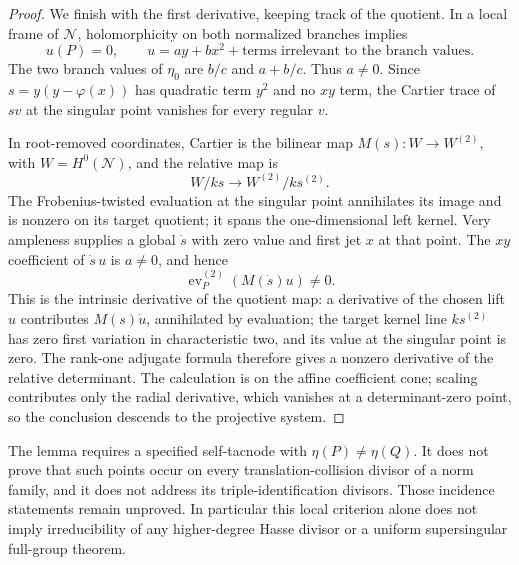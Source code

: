 \begin{proof}
We finish with the first derivative, keeping track of the quotient.
In a local frame of $\mathcal N$, holomorphicity on both normalized
branches implies
\[
        u(P)=0,\qquad
        u=a y+b x^2+\text{terms irrelevant to the branch values}.
\]
The two branch values of $\eta_0$ are $b/c$ and $a+b/c$.
Thus $a\ne0$. Since $s=y(y-\varphi(x))$ has quadratic term $y^2$
and no $xy$ term, the Cartier trace of $sv$ at the singular point
vanishes for every regular $v$.

In root-removed coordinates, Cartier is the bilinear map
$M(s):W\to W^{(2)}$, with $W=H^0(\mathcal N)$, and the relative
map is
\[
                   W/ks\longrightarrow W^{(2)}/ks^{(2)}.
\]
The Frobenius-twisted evaluation at the singular point annihilates
its image and is nonzero on its target quotient; it spans the
one-dimensional left kernel. Very ampleness supplies a global
$\dot s$ with zero value and first jet $x$ at that point. The
$xy$ coefficient of $\dot s\,u$ is $a\ne0$, and hence
\[
             \operatorname{ev}^{(2)}_P(M(\dot s)u)\ne0.
\]
This is the intrinsic derivative of the quotient map: a derivative
of the chosen lift $u$ contributes $M(s)\dot u$, annihilated by
evaluation; the target kernel line $ks^{(2)}$ has zero first
variation in characteristic two, and its value at the singular
point is zero. The rank-one adjugate formula therefore gives a
nonzero derivative of the relative determinant. The calculation
is on the affine coefficient cone; scaling contributes only the
radial derivative, which vanishes at a determinant-zero point, so
the conclusion descends to the projective system.
\end{proof}

\begin{remark}
\label{rem:ss-self-tacnode-global-gate}
The lemma requires a specified self-tacnode with
$\eta(P)\ne\eta(Q)$. It does not prove that such points occur on
every translation-collision divisor of a norm family, and it does
not address its triple-identification divisors. Those incidence
statements remain unproved. In particular this local criterion
alone does not imply irreducibility of any higher-degree Hasse
divisor or a uniform supersingular full-group theorem.
\end{remark}
